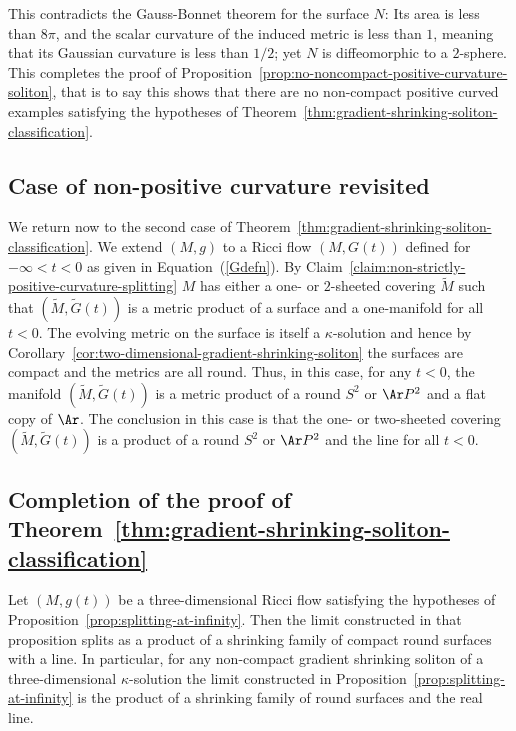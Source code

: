 This contradicts the Gauss-Bonnet theorem for the surface $N$: Its
area is less than $8\pi$, and the  scalar curvature of the induced
metric is less than $1$, meaning that its Gaussian curvature is less
than $1/2$; yet $N$ is diffeomorphic to a $2$-sphere. This completes
the proof of Proposition~\ref{prop:no-noncompact-positive-curvature-soliton}, that is to say this shows
that there are no non-compact positive curved examples satisfying
the hypotheses of Theorem~\ref{thm:gradient-shrinking-soliton-classification}.

\subsection{Case of non-positive curvature revisited}



We return now to the second case of Theorem~\ref{thm:gradient-shrinking-soliton-classification}.  We
extend $(M,g)$ to a Ricci flow $(M,G(t))$ defined for $-\infty<t<0$
as given in Equation~(\ref{Gdefn}). By Claim~\ref{claim:non-strictly-positive-curvature-splitting} $M$
has either a one- or $2$-sheeted covering $\widetilde M$ such that
$(\widetilde M,\tilde G(t))$ is a metric product of a surface and a
one-manifold for all $t<0$. The evolving metric on the surface is
itself a $\kappa$-solution and hence by Corollary~\ref{cor:two-dimensional-gradient-shrinking-soliton} the
surfaces are compact and the metrics are all round. Thus, in this
case, for any $t<0$, the manifold $(\widetilde M,\tilde G(t))$ is a
metric product of a round $S^2$ or $\Ar P^2$ and a flat copy of
$\Ar$.  The conclusion in this case is that the one- or two-sheeted
covering $(\widetilde M,\tilde G(t))$ is a product of a round $S^2$
or $\Ar P^2$ and the line for all $t<0$.

\subsection{Completion of the proof of Theorem~{\ref{thm:gradient-shrinking-soliton-classification}}}



\begin{corollary}\label{cor:three-dimensional-splitting-compact-surfaces}
\label{3Dinfty}
Let $(M,g(t))$ be a three-dimensional Ricci flow satisfying the hypotheses of
Proposition~\ref{prop:splitting-at-infinity}. Then the limit constructed in that proposition
splits as a product of a shrinking family of compact round surfaces with a
line. In particular, for any non-compact gradient shrinking soliton of a
three-dimensional $\kappa$-solution the limit constructed in
Proposition~\ref{prop:splitting-at-infinity} is the product of a shrinking family of round
surfaces and the real line.
\end{corollary}

